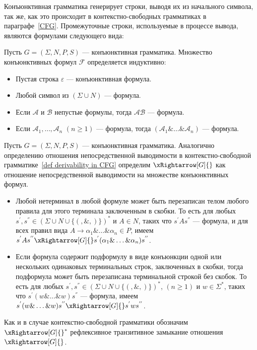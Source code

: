 Конъюнктивная грамматика генерирует строки, выводя их из начального символа, так же, как это происходит в контекстно-свободных грамматиках в параграфе~\ref{CFG}. Промежуточные строки, используемые в процессе вывода, являются формулами следующего вида:

\begin{definition}\label{Definition of conjunctive formula}
    Пусть $G = (\Sigma,N,P,S)$ --- конъюнктивная грамматика. Множество конъюнктивных формул $ \mathcal{F}$ определяется индуктивно:
    \begin{itemize}
        \item Пустая строка $\varepsilon$ --- конъюнктивная формула. 
        \item Любой символ из $(\Sigma \cup N)$ --- формула.
        \item Если $\mathcal{A}$ и $\mathcal{B}$ непустые формулы, тогда $\mathcal{AB}$ --- формула.
        \item Если $\mathcal{A}_1,\ldots,\mathcal{A}_n$ $(n \geqslant 1)$ --- формула, тогда $(\mathcal{A}_1\&\ldots\&\mathcal{A}_n)$ --- формула.
    \end{itemize}
\end{definition}

\begin{definition}
    Пусть $G = (\Sigma,N,P,S)$ --- конъюнктивная грамматика. Аналогично определению отношения непосредственной выводимости в контекстно-свободной грамматике~\ref{def derivability in CFG} определим $\xRightarrow[G]{}$ как отношение непосредственной выводимости на множестве конъюнктивных формул.
    \begin{itemize}
        \item Любой нетерминал в любой формуле может быть перезаписан телом любого правила для этого терминала заключенным в скобки. То есть для любых $s^{'},s^{''} \in (\Sigma \cup N \cup \{(, \&, )\})^*$ и $A\in N$, таких что $s^{'}As^{''}$ --- формула, и для всех правил вида $A \rightarrow \alpha_1\&\ldots\&\alpha_n \in P$, имеем $s^{'}As^{''}\xRightarrow[G]{}s^{'}(\alpha_1\&\ldots\&\alpha_n)s^{''}$. 
        \item Если формула содержит подформулу в виде конъюнкции одной или нескольких одинаковых терминальных строк, заключенных в скобки, тогда подформула может быть перезаписана терминальной строкой без скобок. То есть для любых $s^{'},s^{''} \in (\Sigma \cup N \cup \{(, \&, )\})^*$, $(n \geqslant 1)$ и $w \in \Sigma^*$, таких что $s^{'}(w\&\ldots\&w)s^{''}$ --- формула, имеем $s^{'}(w\&\ldots\&w)s^{''}\xRightarrow[G]{}s^{'}ws^{''}$.
    \end{itemize}
    Как и в случае контекстно-свободной грамматики обозначим $\xRightarrow[G]{}^*$ рефлексивное транзитивное замыкание отношения $\xRightarrow[G]{}$.
\end{definition}

